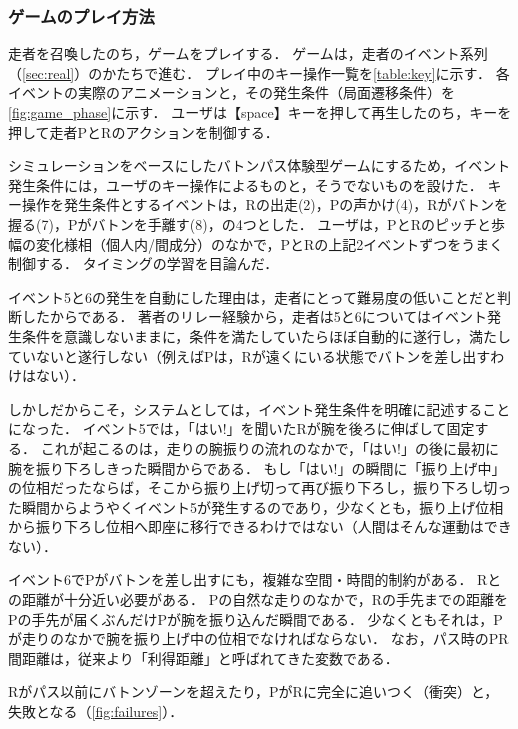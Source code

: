 \documentclass{jsai2e}
\begin{document}
\subsubsection{ゲームのプレイ方法}\label{subsubsec:play}
走者を召喚したのち，ゲームをプレイする．
ゲームは，走者のイベント系列（\ref{sec:real}）のかたちで進む．
プレイ中のキー操作一覧を\ref{table:key}に示す．
各イベントの実際のアニメーションと，その発生条件（局面遷移条件）を\ref{fig:game_phase}に示す．
ユーザは【space】キーを押して再生したのち，キーを押して走者PとRのアクションを制御する．

シミュレーションをベースにしたバトンパス体験型ゲームにするため，イベント発生条件には，ユーザのキー操作によるものと，そうでないものを設けた．
キー操作を発生条件とするイベントは，Rの出走(2)，Pの声かけ(4)，Rがバトンを握る(7)，Pがバトンを手離す(8)，の4つとした．
ユーザは，PとRのピッチと歩幅の変化様相（個人内/間成分）のなかで，PとRの上記2イベントずつをうまく制御する．
タイミングの学習を目論んだ．

イベント5と6の発生を自動にした理由は，走者にとって難易度の低いことだと判断したからである．
著者のリレー経験から，走者は5と6についてはイベント発生条件を意識しないままに，条件を満たしていたらほぼ自動的に遂行し，満たしていないと遂行しない（例えばPは，Rが遠くにいる状態でバトンを差し出すわけはない）．

しかしだからこそ，システムとしては，イベント発生条件を明確に記述することになった．
イベント5では，「はい!」を聞いたRが腕を後ろに伸ばして固定する．
これが起こるのは，走りの腕振りの流れのなかで，「はい!」の後に最初に腕を振り下ろしきった瞬間からである．
もし「はい!」の瞬間に「振り上げ中」の位相だったならば，そこから振り上げ切って再び振り下ろし，振り下ろし切った瞬間からようやくイベント5が発生するのであり，少なくとも，振り上げ位相から振り下ろし位相へ即座に移行できるわけではない（人間はそんな運動はできない）．

イベント6でPがバトンを差し出すにも，複雑な空間・時間的制約がある．
Rとの距離が十分近い必要がある．
Pの自然な走りのなかで，Rの手先までの距離をPの手先が届くぶんだけPが腕を振り込んだ瞬間である．
少なくともそれは，Pが走りのなかで腕を振り上げ中の位相でなければならない．
なお，パス時のPR間距離は，従来より「利得距離」\cite{matsubayashi2022}と呼ばれてきた変数である．


Rがパス以前にバトンゾーンを超えたり，PがRに完全に追いつく（衝突）と，失敗となる（\ref{fig:failures}）．
\end{document}
